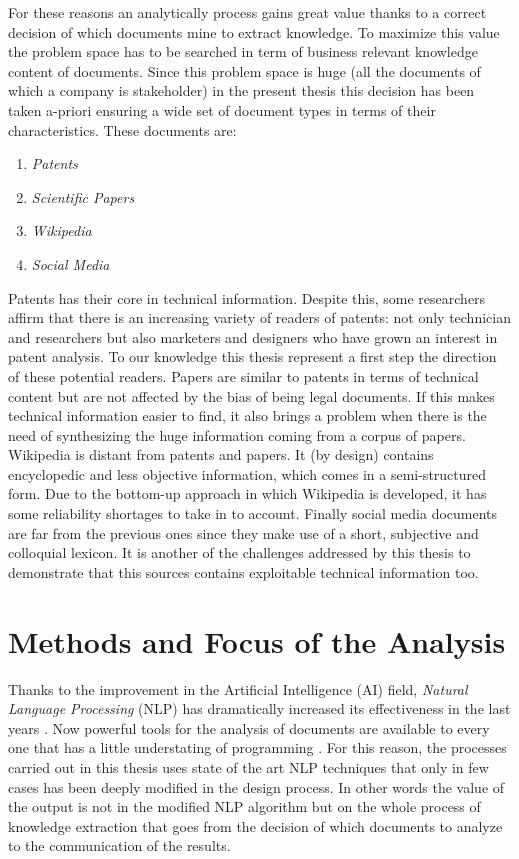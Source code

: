 \documentclass[b5paper,]{book}
\providecommand{\tightlist}{%
  \setlength{\itemsep}{0pt}\setlength{\parskip}{0pt}}
\theoremstyle{definition}
\theoremstyle{definition}
\theoremstyle{definition}
\theoremstyle{remark}
\begin{document}
For these reasons an analytically process gains great value thanks to a
correct decision of which documents mine to extract knowledge. To
maximize this value the problem space has to be searched in term of
business relevant knowledge content of documents. Since this problem
space is huge (all the documents of which a company is stakeholder) in
the present thesis this decision has been taken a-priori ensuring a wide
set of document types in terms of their characteristics. These documents
are:

\begin{enumerate}
\def\labelenumi{\arabic{enumi}.}
\tightlist
\item
  \emph{Patents}
\item
  \emph{Scientific Papers}
\item
  \emph{Wikipedia}
\item
  \emph{Social Media}
\end{enumerate}

Patents has their core in technical information. Despite this, some
researchers \citep{bonino2010review} affirm that there is an increasing
variety of readers of patents: not only technician and researchers but
also marketers and designers who have grown an interest in patent
analysis. To our knowledge this thesis represent a first step the
direction of these potential readers. Papers are similar to patents in
terms of technical content but are not affected by the bias of being
legal documents. If this makes technical information easier to find, it
also brings a problem when there is the need of synthesizing the huge
information coming from a corpus of papers. Wikipedia is distant from
patents and papers. It (by design) contains encyclopedic and less
objective information, which comes in a semi-structured form. Due to the
bottom-up approach in which Wikipedia is developed, it has some
reliability shortages to take in to account. Finally social media
documents are far from the previous ones since they make use of a short,
subjective and colloquial lexicon. It is another of the challenges
addressed by this thesis to demonstrate that this sources contains
exploitable technical information too.

\section{Methods and Focus of the
Analysis}\label{methods-and-focus-of-the-analysis}

Thanks to the improvement in the Artificial Intelligence (AI) field,
\emph{Natural Language Processing} (NLP) has dramatically increased its
effectiveness in the last years \citep{russell2016artificial}. Now
powerful tools for the analysis of documents are available to every one
that has a little understating of programming
\citep[\citet{Kenneth2018spacyr},
\citet{Wijffels2018udpipe}]{Taylor2017Tidy}. For this reason, the
processes carried out in this thesis uses state of the art NLP
techniques that only in few cases has been deeply modified in the design
process. In other words the value of the output is not in the modified
NLP algorithm but on the whole process of knowledge extraction that goes
from the decision of which documents to analyze to the communication of
the results.
\end{document}
